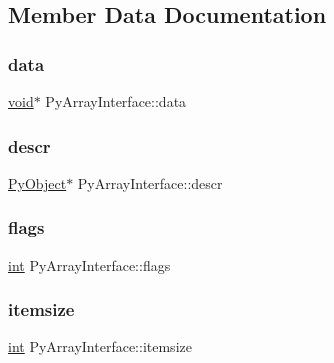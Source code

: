 \subsection{Member Data Documentation}
\mbox{\label{struct_py_array_interface_a95a1efdd290ee7c788220b3802ccd717}} 
\subsubsection{\texorpdfstring{data}{data}}
{\footnotesize\ttfamily \mbox{\hyperlink{_s_d_l__opengles2__gl2ext_8h_ae5d8fa23ad07c48bb609509eae494c95}{void}}$\ast$ Py\+Array\+Interface\+::data}

\mbox{\label{struct_py_array_interface_a7d517913182eeea2ee7cdb4803185cd6}} 
\subsubsection{\texorpdfstring{descr}{descr}}
{\footnotesize\ttfamily \mbox{\hyperlink{_python27_2object_8h_aadc84ac7aed2cfa6f20c25f62bf3dac7}{Py\+Object}}$\ast$ Py\+Array\+Interface\+::descr}

\mbox{\label{struct_py_array_interface_ae4f40681a287c2abd1b36e9a660a1ad3}} 
\subsubsection{\texorpdfstring{flags}{flags}}
{\footnotesize\ttfamily \mbox{\hyperlink{warnings_8h_a74f207b5aa4ba51c3a2ad59b219a423b}{int}} Py\+Array\+Interface\+::flags}

\mbox{\label{struct_py_array_interface_a175d53ca477bddfa28d6d0651bdb1a67}} 
\subsubsection{\texorpdfstring{itemsize}{itemsize}}
{\footnotesize\ttfamily \mbox{\hyperlink{warnings_8h_a74f207b5aa4ba51c3a2ad59b219a423b}{int}} Py\+Array\+Interface\+::itemsize}


